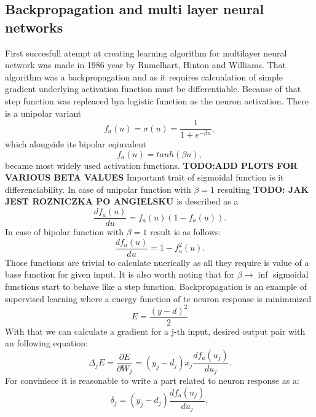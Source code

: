 \subsection{Backpropagation and multi layer neural networks}
First succesfull atempt at creating learning algorithm for multilayer neural network was made
in 1986 year by Rumelhart, Hinton and Williams. That algorithm was a backpropagation and as it
requires calcualation of simple gradient underlying activation function must be differentiable.
Because of that step function was repleaced bya logistic function as the neuron activation.
There is a unipolar variant
\begin{equation}
	f_{a}(u) = \sigma(u) = \frac{1}{1+e^{-\beta u}},
\end{equation}
which alongside its bipolar eqiuvalent
\begin{equation}
	f_{a}(u)=tanh(\beta u),
\end{equation}
became most widely used activation functions.
\textbf{TODO:ADD PLOTS FOR VARIOUS BETA VALUES}
Important trait of sigmoidal function is it differenciability. In case of unipolar function
with $\beta = 1$ resulting \textbf{TODO: JAK JEST ROZNICZKA PO ANGIELSKU} is described as a 
\begin{equation}
	\frac{df_{a}(u)}{du}=f_{a}(u)(1-f_{a}(u)).
\end{equation}
In case of bipolar function with $\beta = 1$ result is as follows:
\begin{equation}
	\frac{df_{a}(u)}{du}=1-f_{a}^{2}(u).
\end{equation}
Those functions are trivial to calculate nuerically as all they require is value of a base
function for given input. It is also worth noting that for $\beta \rightarrow \inf$ sigmoidal
functions start to behave like a step function.
Backpropagation is an example of supervised learning where a energy function of te neuron
response is minimmized
\begin{equation}
	E=\frac{(y-d)^{2}}{2}
\end{equation}
With that we can calculate a gradient for a j-th input, desired output pair with an following
equation:
\begin{equation}
	\Delta_{j}E = \frac{\partial E}{\partial W_{j}} = (y_{j}-d_{j})x_{j}\frac{df_{a}(u_{j})}{du_{j}}. 
\end{equation}
For conviniece it is reasonable to write a part related to neuron response as a:
\begin{equation}
	\delta_{j} = (y_{j}-d_{j})\frac{df_{a}(u_{j})}{du_{j}}, 
\end{equation}
